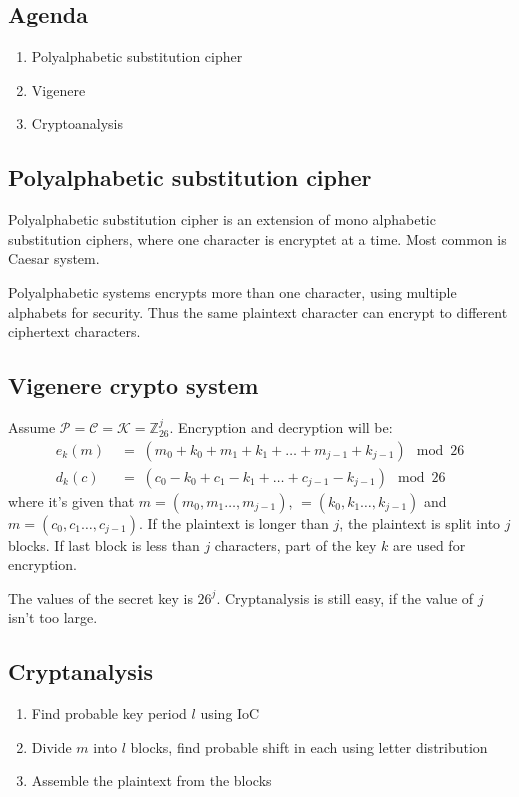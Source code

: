 

\subsection{Agenda}
\begin{enumerate}
\item Polyalphabetic substitution cipher
\item Vigenere
\item Cryptoanalysis
\end{enumerate}

\subsection{Polyalphabetic substitution cipher}
Polyalphabetic substitution cipher is an extension of mono alphabetic
substitution ciphers, where one character is encryptet at a time. Most
common is Caesar system.

Polyalphabetic systems encrypts more than one character, using
multiple alphabets for security. Thus the same plaintext character can
encrypt to different ciphertext characters.

\subsection{Vigenere crypto system}
Assume $\mathcal{P} = \mathcal{C} = \mathcal{K} =
\mathbb{Z}_{26}^j$. Encryption and decryption will be:
\begin{align*}
  e_{k}(m) \; &= \; (m_0+k_0 +m_1+k_1 + \ldots
  +m_{j-1}+k_{j-1} )  \mod 26\\
  d_{k}(c) \; &= \; (c_0-k_0 +c_1-k_1 + \ldots +c_{j-1}-k_{j-1} ) \mod 26
\end{align*}
where it's given that $m=(m_0,m_1 \ldots,m_{j-1})$, $=(k_0,k_1
\ldots,k_{j-1})$ and $m=(c_0,c_1 \ldots,c_{j-1})$. If the plaintext is
longer than $j$, the plaintext is split into $j$ blocks. If last block
is less than $j$ characters, part of the key $k$ are used for
encryption.

The values of the secret key is $26^j$. Cryptanalysis is still easy,
if the value of $j$ isn't too large.

\subsection{Cryptanalysis}
\begin{enumerate}
\item Find probable key period $l$ using IoC
\item Divide $m$ into $l$ blocks, find probable shift in each using
  letter distribution
\item Assemble the plaintext from the blocks
\end{enumerate}

